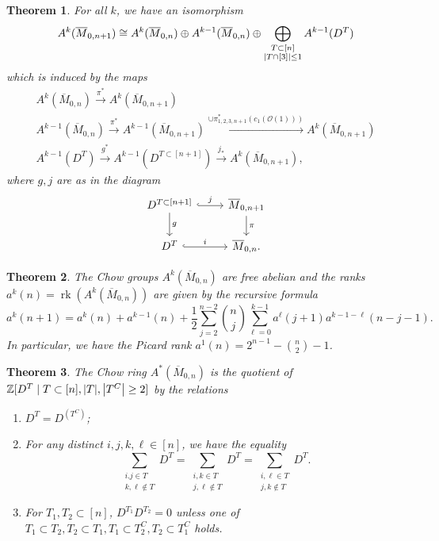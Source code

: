 \documentclass{amsart}
\newtheorem{thm}{Theorem}[section]
\theoremstyle{definition}
\theoremstyle{remark}
\theoremstyle{plain}
\theoremstyle{definition}
\theoremstyle{remark}
\newcommand{\Z}{\mathbb{Z}}
\newcommand{\msc}[1]{\mathscr{#1}}
\newcommand{\ol}[1]{\overline{#1}}
\begin{document}
\begin{thm}
    For all $k$, we have an isomorphism
    \[ A^k(\ol{M}_{0,n+1}) \cong A^k(\ol{M}_{0,n}) \oplus A^{k-1}(\ol{M}_{0,n}) \oplus \bigoplus_{\substack{T \subset [n] \\ \abs{T \cap [3]} \leq 1}} A^{k-1}(D^T) \]
    which is induced by the maps
    \begin{align*}
        A^k(\ol{M}_{0,n}) \xrightarrow{\pi^*} A^k(\ol{M}_{0,n+1}) \\
        A^{k-1}(\ol{M}_{0,n}) \xrightarrow{\pi^*} A^{k-1}(\ol{M}_{0,n+1}) \xrightarrow{\cup \pi_{1,2,3,n+1}^* (c_1(\msc{O}(1)))} A^k(\ol{M}_{0,n+1}) \\
        A^{k-1}(D^T) \xrightarrow{g^*} A^{k-1}(D^{T \subset [n+1]}) \xrightarrow{j_*} A^k(\ol{M}_{0,n+1}),
    \end{align*}
    where $g,j$ are as in the diagram
    \begin{equation*}
    \begin{tikzcd}
        D^{T \subset [n+1]} \ar{d}{g} \ar[hookrightarrow]{r}{j} & \ol{M}_{0,n+1} \ar{d}{\pi} \\
        D^T \ar[hookrightarrow]{r}{i} & \ol{M}_{0,n}.
    \end{tikzcd}
    \end{equation*}
\end{thm}

\begin{thm}
    The Chow groups $A^k(\ol{M}_{0,n})$ are free abelian and the ranks $a^k(n) = \operatorname{rk}(A^k(\ol{M}_{0,n}))$ are given by the recursive formula
    \[ a^k(n+1) = a^k(n) + a^{k-1}(n) + \frac{1}{2} \sum_{j=2}^{n-2} \binom{n}{j} \sum_{\ell=0}^{k-1} a^{\ell}(j+1) a^{k-1-\ell}( n-j-1 ). \]
    In particular, we have the Picard rank $a^1(n) = 2^{n-1} - \binom{n}{2} - 1$.
\end{thm}

\begin{thm}
    The Chow ring $A^*(\ol{M}_{0,n})$ is the quotient of $\Z[D^T \mid T \subset [n], \abs{T}, \abs{T^C} \geq 2]$
    by the relations
    \begin{enumerate}
        \item $D^T = D^{(T^C)}$;
        \item For any distinct $i,j,k,\ell \in [n]$, we have the equality
            \[ \sum_{\substack{i.j\in T \\ k,\ell \notin T}} D^T = \sum_{\substack{i,k\in T \\ j,\ell \notin T}} D^T = \sum_{\substack{i,\ell \in T \\ j,k \notin T}} D^T. \]
        \item For $T_1, T_2 \subset [n]$, $D^{T_1} D^{T_2} = 0$ unless one of $T_1 \subset T_2, T_2 \subset T_1, T_1 \subset T_2^C, T_2 \subset T_1^C$ holds.
    \end{enumerate}
\end{thm}
\end{document}
